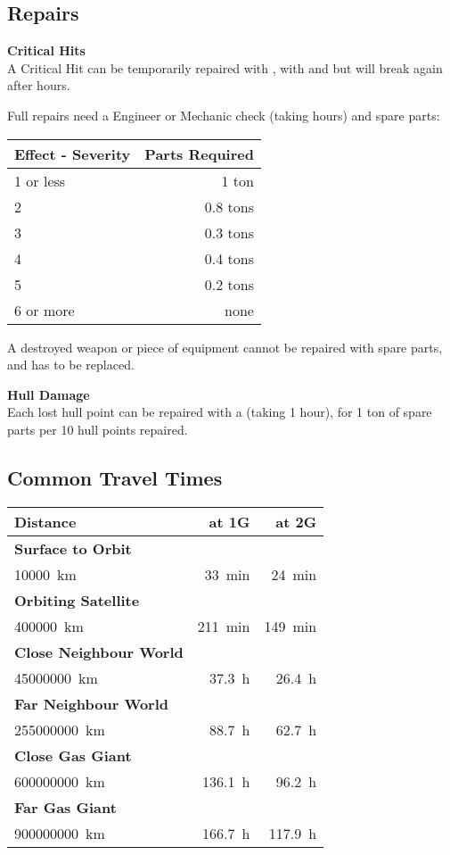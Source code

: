 \documentclass{cheatsheet}
\begin{document}
\begin{multicols}{3}
\subsection{Repairs}

\textbf{Critical Hits}\\
A Critical Hit can be temporarily repaired with , with  and
 but will break again after  hours.

Full repairs need a Engineer or Mechanic check (taking 
hours) and spare parts:

\begin{tabularx}{\linewidth}{Xr} \toprule
  Effect - Severity & Parts Required \\ \midrule
  1 or less & 1 ton \\
  2 & 0.8 tons \\
  3 & 0.3 tons \\
  4 & 0.4 tons \\
  5 & 0.2 tons \\
  6 or more & none \\ \bottomrule
\end{tabularx}

A destroyed weapon or piece of equipment cannot be repaired with spare
parts, and has to be replaced.

\textbf{Hull Damage}\\
Each lost hull point can be repaired with a
 (taking 1
hour), for 1 ton of spare parts per 10 hull points repaired.

\subsection{Common Travel Times}

\begin{tabularx}{\linewidth}{Xrr} \toprule
  Distance & at 1G & at 2G \\ \midrule
  \textbf{Surface to Orbit} & & \\
  \SI{10000}{\kilo\meter} & \SI{33}{\minute} & \SI{24}{\minute} \\
  \textbf{Orbiting Satellite} & & \\
  \SI{400000}{\kilo\meter} & \SI{211}{\minute} & \SI{149}{\minute} \\
  \textbf{Close Neighbour World} & & \\
  \SI{45000000}{\kilo\meter} & \SI{37.3}{\hour} & \SI{26.4}{\hour} \\
  \textbf{Far Neighbour World} & & \\
  \SI{255000000}{\kilo\meter} & \SI{88.7}{\hour} & \SI{62.7}{\hour} \\
  \textbf{Close Gas Giant} & & \\
  \SI{600000000}{\kilo\meter} & \SI{136.1}{\hour} & \SI{96.2}{\hour} \\
  \textbf{Far Gas Giant} & & \\
  \SI{900000000}{\kilo\meter} & \SI{166.7}{\hour} & \SI{117.9}{\hour} \\ \bottomrule
\end{tabularx}


\end{multicols}
\end{document}
